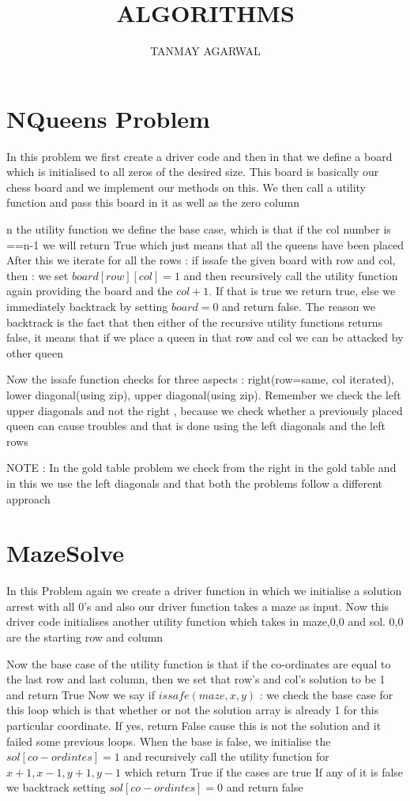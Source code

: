 \documentclass{article}
\newcommand{\nd}{\noindent}
\begin{document}
\title{ALGORITHMS}
\author{TANMAY AGARWAL}
\date{}
\tableofcontents
\maketitle
\section{NQueens Problem}
In this problem we first create a driver code and then in that we define a board which is initialised to all zeros of the desired size. This board is basically our chess board and we implement our methods on this.
We then call a utility function and pass this board in it as well as the zero column 

\nd n the utility function we define the base case, which is that if the col number is ==n-1 we will return True which just means that all the queens have been placed 
After this we iterate for all the rows : if issafe the given board with row and col, then : we set $board[row][col]=1$ and then recursively call the utility function again providing the board and the $col+1$. If that is true we return true, else we immediately backtrack by setting $board=0$ and return false. The reason we backtrack is the fact that then either of the recursive utility functions returns false, it means that if we place a queen in that row and col we can be attacked by other queen 

\nd Now the issafe function checks for three aspects : right(row=same, col iterated), lower diagonal(using zip), upper diagonal(using zip). Remember we check the left upper diagonals and not the right , because we check whether a previously 
placed queen can cause troubles and that is done using the left diagonals and the left rows 

\nd NOTE : In the gold table problem we check from the right in the gold table and in this we use the left diagonals and that both the problems follow a different approach 

\section{MazeSolve}
In this Problem again we create a driver function in which we initialise a solution arrest with all 0’s and also our driver function takes a maze as input. Now this driver code initialises another utility function which takes in maze,0,0 and sol. 0,0 are the starting row and column 

\nd Now the base case of the utility function is that if the co-ordinates are equal to the last row and last column, then we set that row’s and col’s solution to be 1 and return True
Now we say if $issafe(maze,x,y)$ : we check the base case for this loop which is that whether or not the solution array is already 1 for this particular coordinate. If yes, return False cause this is not the solution and it failed some previous loops. 
When the base is false, we initialise the $sol[co-ordintes]=1$ and recursively call the utility function for $x+1,x-1,y+1,y-1$ which return True if the cases are true
If any of it is false we backtrack setting $sol[co-ordintes]=0$ and return false 
\end{document}
